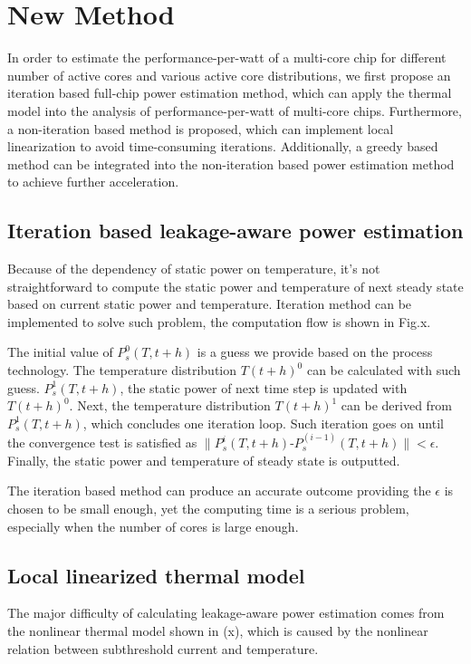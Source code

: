 \section{New Method}
In order to estimate the performance-per-watt of a multi-core chip for different number of 
active cores and various active core distributions, we first propose an iteration based 
full-chip power estimation method, which can apply the thermal model into the analysis of
performance-per-watt of multi-core chips. Furthermore, a non-iteration based method is 
proposed, which can implement local linearization to avoid time-consuming iterations. 
Additionally, a greedy based method can be integrated into the non-iteration based power
estimation method to achieve further acceleration.

\subsection{Iteration based leakage-aware power estimation}
Because of the dependency of static power on temperature, it's not straightforward to compute
the static power and temperature of next steady state based on current static power and 
temperature. Iteration method can be implemented to solve such problem, the computation flow 
is shown in Fig.x.

The initial value of $P^0_s(T,t+h)$ is a guess we provide based on the process technology.
The temperature distribution $T(t+h)^0$ can be calculated with such guess. $P^1_s(T,t+h)$,
the static power of next time step is updated with $T(t+h)^0$. Next, the temperature 
distribution $T(t+h)^1$ can be derived from $P^1_s(T,t+h)$, which concludes one iteration
loop. Such iteration goes on until the convergence test is satisfied as 
$\parallel P^i_s(T,t+h)$-$P^(i-1)_s(T,t+h)\parallel<\epsilon$. Finally, the static power and
temperature of steady state is outputted.

The iteration based method can produce an accurate outcome providing the $\epsilon$ is 
chosen to be small enough, yet the computing time is a serious problem, especially when the
number of cores is large enough.

\subsection{Local linearized thermal model}
The major difficulty of calculating leakage-aware power estimation comes from the nonlinear 
thermal model shown in (x), which is caused by the nonlinear relation between subthreshold 
current and temperature.

